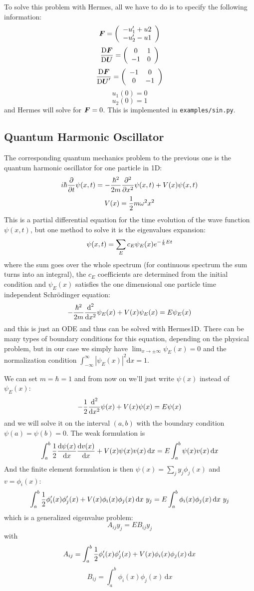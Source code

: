\documentclass[12pt]{article}
\newcommand{\bfF}{\mbox{\boldmath $F$}}
\newcommand{\bfU}{\mbox{\boldmath $U$}}
\def\d{\mbox{d}}
\begin{document}
To solve this problem with Hermes, all we have to do is to specify the
following information:
$${\bfF} =
\left( \begin{array}{c}
-u_1'+u2 \\
-u_2'-u1 \\
\end{array} \right)
$$
$$
{{\rm D}\bfF\over{\rm D}\bfU}=
\left( \begin{array}{cc}
0 & 1 \\
-1 & 0 \\
\end{array} \right)
$$
$$
{{\rm D}\bfF\over{\rm D}\bfU'}=
\left( \begin{array}{cc}
-1 & 0 \\
0 & -1 \\
\end{array} \right)
$$
$$u_1(0)=0$$
$$u_2(0)=1$$
and Hermes will solve for $\bfF=0$. This is implemented in
\texttt{examples/sin.py}.

\subsection{Quantum Harmonic Oscillator}

The corresponding quantum mechanics problem to the previous one is the quantum
harmonic oscillator for one particle in 1D:
$$
i\hbar{\partial\over\partial t}\psi(x, t)=
-{\hbar^2\over2m}{\partial^2\over\partial x^2}\psi(x,t)+V(x)\psi(x,t)
$$
$$
V(x)={1\over2}m\omega^2x^2
$$
This is a partial differential equation for the time evolution of the wave
function $\psi(x, t)$, but one method to solve it is the
eigenvalues expansion:
$$\psi(x,t) = \sum_E c_E\psi_E(x)e^{-{i\over\hbar}Et}$$
where the sum goes over the whole spectrum (for continuous spectrum the sum
turns into an integral), the $c_E$ coefficients are determined from the initial condition
and $\psi_E(x)$ satisfies the one dimensional one particle time independent
Schr\"odinger equation:
$$
-{\hbar^2\over2m}{\d^2\over\d x^2}\psi_E(x)+V(x)\psi_E(x)=E\psi_E(x)
$$
and this is just an ODE and thus can be solved with Hermes1D. There can be many
types of boundary conditions for this equation, depending on the physical
problem, but in our case we simply have $\lim_{x\to\pm\infty}\psi_E(x)=0$ and
the normalization condition $\int_{-\infty}^\infty|\psi_E(x)|^2\d x=1$.

We can set $m=\hbar=1$ and from now on we'll just write $\psi(x)$ instead of
$\psi_E(x)$:
$$
-{1\over2}{\d^2\over\d x^2}\psi(x)+V(x)\psi(x)=E\psi(x)
$$
and we will solve it on the interval $(a, b)$ with the boundary condition
$\psi(a)=\psi(b)=0$. The weak formulation is
$$
\int_a^b{1\over2}{\d\psi(x)\over\d x}{\d v(x)\over\d x}+V(x)\psi(x)v(x)\,\d x
=E\int_a^b\psi(x)v(x)\,\d x
$$
And the finite element formulation is then $\psi(x)=\sum_j y_j\phi_j(x)$ and
$v=\phi_i(x)$:
$$
\int_a^b{1\over2}\phi_i'(x)\phi_j'(x)+V(x)\phi_i(x)\phi_j(x)\,\d x\ y_j
=E\int_a^b\phi_i(x)\phi_j(x)\,\d x\ y_j
$$
which is a generalized eigenvalue problem:
$$
A_{ij}y_j=EB_{ij}y_j
$$
with
$$
A_{ij}=\int_a^b{1\over2}\phi_i'(x)\phi_j'(x)+V(x)\phi_i(x)\phi_j(x)\,\d x
$$
$$
B_{ij}=\int_a^b\phi_i(x)\phi_j(x)\,\d x
$$
\end{document}
